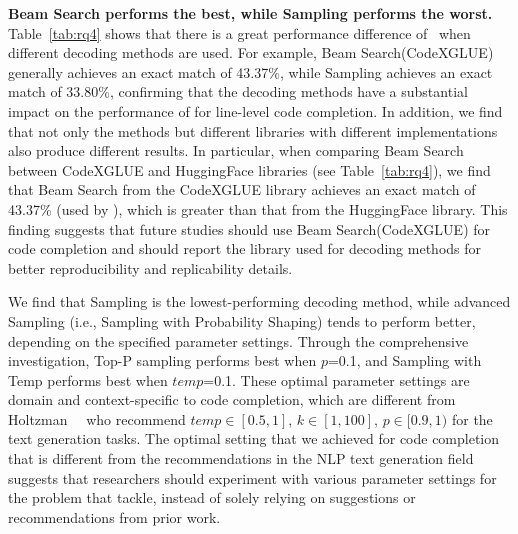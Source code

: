 


\textbf{Beam Search performs the best, while Sampling performs the worst.}
Table~\ref{tab:rq4} shows that there is a great performance difference of \our~when different decoding methods are used.
For example, Beam Search(CodeXGLUE) generally achieves an exact match of 43.37\%, while Sampling achieves an exact match of 33.80\%, confirming that the decoding methods have a substantial impact on the performance of \our for line-level code completion.
In addition, we find that not only the methods but different libraries with different implementations also produce different results.
In particular, when comparing Beam Search between CodeXGLUE and HuggingFace libraries (see Table~\ref{tab:rq4}), we find that Beam Search from the CodeXGLUE library achieves an exact match of 43.37\% (used by \our), which is greater than that from the HuggingFace library.
This finding suggests that future studies should use Beam Search(CodeXGLUE) for code completion and should report the library used for decoding methods for better reproducibility and replicability details.




We find that Sampling is the lowest-performing decoding method, while advanced Sampling (i.e., Sampling with Probability Shaping) tends to perform better, depending on the specified parameter settings.
Through the comprehensive investigation, Top-P sampling performs best when $p$=0.1, and Sampling with Temp performs best when $temp$=0.1.
These optimal parameter settings are domain and context-specific to code completion, which are different from Holtzman~\ea~\cite{holtzman2019curious} who recommend $temp\in[0.5,1]$, $k\in[1,100]$, $p\in[0.9,1)$ for the text generation tasks.
The optimal setting that we achieved for code completion that is different from the recommendations in the NLP text generation field suggests that researchers should experiment with various parameter settings for the problem that tackle, instead of solely relying on suggestions or recommendations from prior work.


